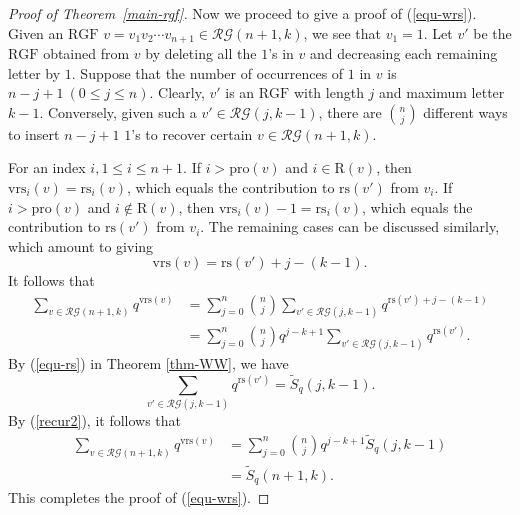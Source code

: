 \documentclass[12pt]{amsart}
\numberwithin{equation}{section}
\theoremstyle{plain}
\theoremstyle{definition}
\def\RGF{\mathrm{RGF}}
\def\rs{\mathrm{rs}}
\def\wrs{\mathrm{vrs}}
\def\pl{\mathrm{pro}}
\def\RR{\mathrm{R}}
\def\RG{\mathcal{RG}}
\begin{document}
\begin{proof}[Proof of Theorem~\ref{main-rgf}]
Now we proceed to give a proof of (\ref{equ-wrs}).
Given an $\RGF$ $v=v_1 v_2 \cdots v_{n+1} \in \RG(n+1,k)$,
we see that $v_1=1$.
Let $v'$ be the $\RGF$ obtained from $v$ by
deleting all the $1$'s in $v$ and decreasing
each remaining letter by $1$. Suppose that the number of occurrences of $1$ in $v$ is $n-j+1~(0 \leq j \leq n)$. Clearly, $v'$
is an $\RGF$ with length $j$ and maximum letter $k-1$. Conversely, given such a $v'\in\RG(j,k-1)$, there are $\binom{n}{j}$ different ways to insert $n-j+1$ $1$'s to recover certain $v\in\RG(n+1,k)$.

For an index $i, 1\le i\le n+1$. If $i>\pl(v)$ and $i\in\RR(v)$, then $\wrs_i(v)=\rs_i(v)$, which equals the contribution to $\rs(v')$ from $v_i$. If $i>\pl(v)$ and $i\not\in\RR(v)$, then $\wrs_i(v)-1=\rs_i(v)$, which equals the contribution to $\rs(v')$ from $v_i$. The remaining cases can be discussed similarly, which amount to giving
\[\wrs(v)=\rs(v')+j-(k-1).\]
It follows that
\begin{align*}
  \sum_{v \in \RG(n+1,k)} q^{\wrs(v)}& = \sum_{j=0}^n  \binom{n}{j}  \sum_{v' \in \RG(j,k-1)} q^{\rs(v')+j-(k-1)}\\[5pt]
   &=\sum_{j=0}^n \binom{n}{j}  q^{j-k+1}\sum_{v' \in \RG(j,k-1)} q^{\rs(v')}.
\end{align*}
By (\ref{equ-rs}) in Theorem \ref{thm-WW},
we have
\begin{equation*}
  \sum_{v' \in \RG(j,k-1)} q^{\rs(v')}=\widetilde{S}_q(j,k-1).
\end{equation*}
By (\ref{recur2}), it follows that
\begin{align*}
  \sum_{v \in \RG(n+1,k)} q^{\wrs(v)} & =\sum_{j=0}^n \binom{n}{j}  q^{j-k+1} \widetilde{S}_q(j,k-1) \\[5pt]
   & = \widetilde{S}_q(n+1,k).
\end{align*}
This completes the proof of (\ref{equ-wrs}).
\end{proof}

\end{document}
